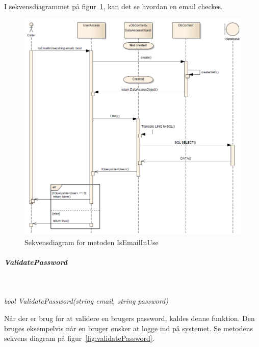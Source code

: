 I sekvensdiagrammet på figur~\ref{fig:isEmailInUse}, kan det se hvordan en email checkes.

\begin{figure}[h]
\centering
\includegraphics[width=\linewidth]{figs/dbSeq/isEmailInUse.PNG}
\caption{Sekvensdiagram for metoden IsEmailInUse}
\label{fig:isEmailInUse}
\end{figure}


\subparagraph{ValidatePassword}\

\textit{bool ValidatePassword(string email, string password)}

Når der er brug for at validere en brugers password, kaldes denne funktion. Den bruges eksempelvis når en bruger ønsker at logge ind på systemet. Se metodens sekvens diagram på figur~\ref{fig:validatePassword}.
	
